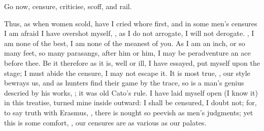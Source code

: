 Go now, censure, criticise, scoff, and rail.


Thus, as when women scold, have I cried whore first, and in some men's censures
I am afraid I have overshot myself, , as
I do not arrogate, I will not derogate. ,
I am none of the best, I am none of the meanest of you. As I am an inch, or so
many feet, so many parasangs, after him or him, I may be peradventure an ace
before thee. Be it therefore as it is, well or ill, I have essayed, put myself
upon the stage; I must abide the censure, I may not escape it. It is most true,
, our style bewrays us, and as
hunters find their game by the trace, so is a man's genius
descried by his works, ; it was old Cato's rule. I have laid myself open (I know it)
in this treatise, turned mine inside outward: I shall be censured, I doubt not;
for, to say truth with Erasmus, , there is
nought so peevish as men's judgments; yet this is some comfort, , our censures are as various as our palates.


